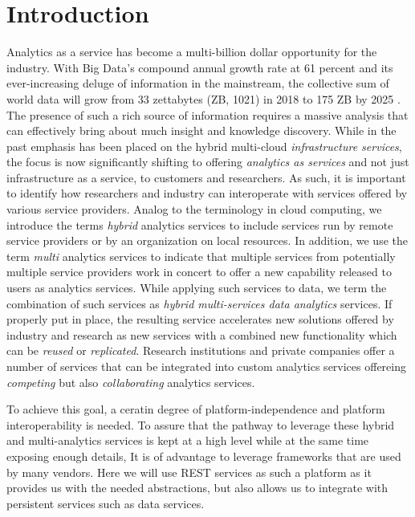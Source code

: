 
\section{Introduction}
\label{sec:summary}


Analytics as a service has become a multi-billion dollar opportunity
for the industry. With Big Data's compound annual growth rate at 61
percent and its ever-increasing deluge of information in the
mainstream, the collective sum of world data will grow from 33
zettabytes (ZB, 1021) in 2018 to 175 ZB by 2025 . The presence of such a rich source
of information requires a massive analysis that can effectively bring
about much insight and knowledge discovery.  While in the past
emphasis has been placed on the hybrid multi-cloud {\em infrastructure
services}, the focus is now significantly shifting to offering {\em
analytics as services} and not just infrastructure as a service, to
customers and researchers. As such, it is important to identify how
researchers and industry can interoperate with services offered by
various service providers. Analog to the terminology in cloud
computing, we introduce the terms {\em hybrid} analytics services to
include services run by remote service providers or by an organization
on local resources.  In addition, we use the term {\em multi}
analytics services to indicate that multiple services from potentially
multiple service providers work in concert to offer a new capability
released to users as analytics services. While applying such services
to data, we term the combination of such services as {\em hybrid
multi-services data analytics} services. If properly put in place, the
resulting service accelerates new solutions offered by industry and
research as new services with a combined new functionality which can
be {\em reused} or {\em replicated}. Research institutions and private
companies offer a number of services that can be integrated into
custom analytics services offereing {\em competing} but also {\em
collaborating} analytics services.

To achieve this goal, a ceratin degree of platform-independence and
platform interoperability is needed.  To assure that the pathway to
leverage these hybrid and multi-analytics services is kept at a high
level while at the same time exposing enough details, It is of
advantage to leverage frameworks that are used by many vendors. Here
we will use REST services as such a platform as it provides us with
the needed abstractions, but also allows us to integrate with
persistent services such as data services.

